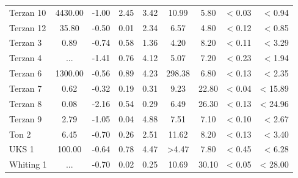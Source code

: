 \documentclass[doublespace,nopageskip]{VTthesis} %
\begin{document}
\begin{appendices}
\begin{center}
\begin{longtable}{lcccccccr}
Terzan 10 & 4430.00 & -1.00 & 2.45 & 3.42 & 10.99 & 5.80 & < 0.03 & < 0.94\\
Terzan 12 & 35.80 & -0.50 & 0.01 & 2.34 & 6.57 & 4.80 & < 0.12 & < 0.85\\
Terzan 3 & 0.89 & -0.74 & 0.58 & 1.36 & 4.20 & 8.20 & < 0.11 & < 3.29\\
Terzan 4 & ... & -1.41 & 0.76 & 4.12 & 5.07 & 7.20 & < 0.23 & < 1.94\\
Terzan 6 & 1300.00 & -0.56 & 0.89 & 4.23 & 298.38 & 6.80 & < 0.13 & < 2.35\\
Terzan 7 & 0.62 & -0.32 & 0.19 & 0.31 & 9.23 & 22.80 & < 0.04 & < 15.89\\
Terzan 8 & 0.08 & -2.16 & 0.54 & 0.29 & 6.49 & 26.30 & < 0.13 & < 24.96\\
Terzan 9 & 2.79 & -1.05 & 0.04 & 4.88 & 7.51 & 7.10 & < 0.10 & < 2.67\\
Ton 2 & 6.45 & -0.70 & 0.26 & 2.51 & 11.62 & 8.20 & < 0.13 & < 3.40\\
UKS 1 & 100.00 & -0.64 & 0.78 & 4.47 & >4.47 & 7.80 & < 0.45 & < 6.28\\
Whiting 1 & ... & -0.70 & 0.02 & 0.25 & 10.69 & 30.10 & < 0.05 & < 28.00\\
\end{longtable}
\end{center}


\end{appendices}
\end{document}
